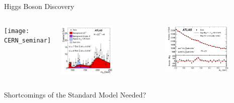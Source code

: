 \documentclass[11pt, xcolor={dvipsnames}, aspectratio=169]{beamer}
\begin{document}
\begin{frame}{Higgs Boson Discovery}

  \begin{columns}
    \centering

    \texttt{[image: CERN\_seminar]}

    \centering

    \includegraphics[width=0.55\textwidth]{higgs_discovery/fig_002}

    \includegraphics[width=0.7\textwidth]{higgs_discovery/figaux_004a}
  \end{columns}
\end{frame}


\begin{frame}{Shortcomings of the Standard Model}
  Needed?
\end{frame}

\end{document}
